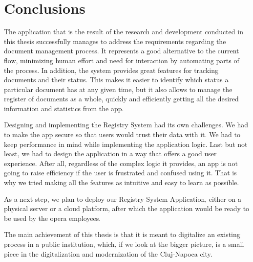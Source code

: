 \chapter{Conclusions}
\label{chapter:conclusions}

The application that is the result of the research and development conducted in this thesis successfully manages to address the requirements regarding the document management process. It represents a good alternative to the current flow, minimizing human effort and need for interaction by automating parts of the process. In addition, the system provides great features for tracking documents and their status. This makes it easier to identify which status a particular document has at any given time, but it also allows to manage the register of documents as a whole, quickly and efficiently getting all the desired information and statistics from the app.

Designing and implementing the Registry System had its own challenges. We had to make the app secure so that users would trust their data with it. We had to keep performance in mind while implementing the application logic. Last but not least, we had to design the application in a way that offers a good user experience. After all, regardless of the complex logic it provides, an app is not going to raise efficiency if the user is frustrated and confused using it. That is why we tried making all the features as intuitive and easy to learn as possible.

As a next step, we plan to deploy our Registry System Application, either on a physical server or a cloud platform, after which the application would be ready to be used by the opera employees.

The main achievement of this thesis is that it is meant to digitalize an existing process in a public institution, which, if we look at the bigger picture, is a small piece in the digitalization and modernization of the Cluj-Napoca city.

